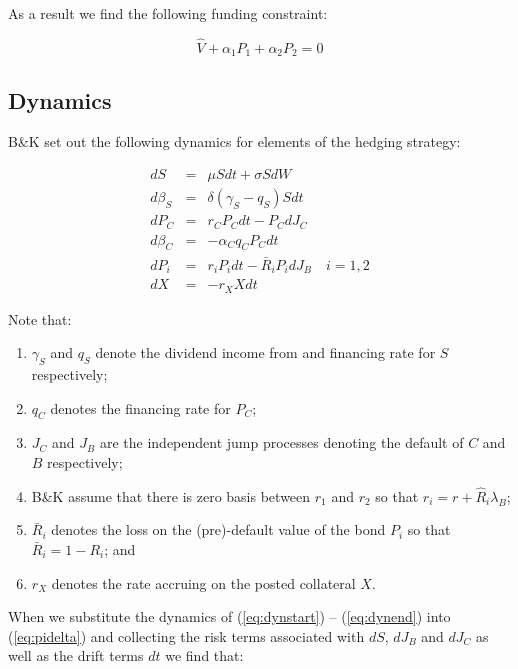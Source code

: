 \documentclass{tufte-handout}
\begin{document}
As a result we find the following funding constraint:

\begin{equation}\label{eq:fundingconstraint}
  \hat{V} + \alpha_1 P_1 + \alpha_2 P_2 = 0
\end{equation}

\subsection{Dynamics}\label{sec:dynamics}

B\&K set out the following dynamics for elements of the hedging strategy:

\begin{eqnarray}
  dS       & = & \mu S dt + \sigma S dW \label{eq:dynstart}\\
  d\beta_S & = & \delta (\gamma_S - q_S) S dt \\
  dP_C     & = & r_C P_C dt - P_C dJ_C \\
  d\beta_C & = &  -\alpha_C q_C P_C dt \\
  dP_i     & = & r_i P_i dt - \bar{R}_i P_i dJ_B \quad i = 1, 2\\
  dX       & = & -r_X X dt \label{eq:dynend}
\end{eqnarray}

Note that:

\begin{enumerate}

\item $\gamma_S$ and $q_S$ denote the dividend income from and financing rate
for $S$ respectively;
\item $q_C$ denotes the financing rate for $P_C$;
\item $J_C$ and $J_B$ are the independent jump processes denoting the default
of $C$ and $B$ respectively;
\item B\&K assume that there is zero basis between $r_1$ and $r_2$ so that
$r_i = r + \hat{R}_i\lambda_B$;
\item $\bar{R}_i$ denotes the loss on the (pre)-default value of the bond $P_i$
so that $\bar{R}_i = 1 - R_i$; and
\item $r_X$ denotes the rate accruing on the posted collateral $X$.
\end{enumerate}

When we substitute the dynamics of (\ref{eq:dynstart}) -- (\ref{eq:dynend}) into
(\ref{eq:pidelta}) and collecting the risk terms associated with $dS$, $dJ_B$ and
$dJ_C$ as well as the drift terms $dt$ we find that:
\end{document}
